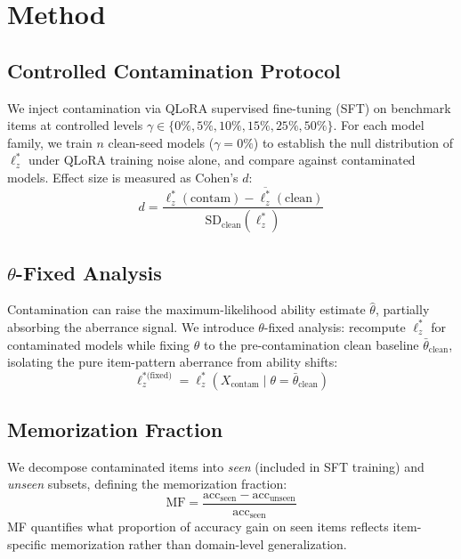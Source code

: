 \documentclass[11pt,a4paper]{article}
\begin{document}
\section{Method}
\label{sec:method}

\subsection{Controlled Contamination Protocol}

We inject contamination via QLoRA supervised fine-tuning (SFT) on benchmark items at controlled levels $\gamma \in \{0\%, 5\%, 10\%, 15\%, 25\%, 50\%\}$.
For each model family, we train $n$ clean-seed models ($\gamma=0\%$) to establish the null distribution of $\ell_z^{*}$ under QLoRA training noise alone, and compare against contaminated models.
Effect size is measured as Cohen's $d$:
\begin{equation}
d = \frac{\ell_z^{*}(\text{contam}) - \overline{\ell_z^{*}}(\text{clean})}{\text{SD}_{\text{clean}}(\ell_z^{*})}
\end{equation}

\subsection{$\theta$-Fixed Analysis}

Contamination can raise the maximum-likelihood ability estimate $\hat{\theta}$, partially absorbing the aberrance signal.
We introduce $\theta$-fixed analysis: recompute $\ell_z^{*}$ for contaminated models while fixing $\theta$ to the pre-contamination clean baseline $\bar{\theta}_{\text{clean}}$, isolating the pure item-pattern aberrance from ability shifts:
\begin{equation}
\ell_z^{*\text{(fixed)}} = \ell_z^{*}(X_{\text{contam}} \mid \theta = \bar{\theta}_{\text{clean}})
\end{equation}

\subsection{Memorization Fraction}

We decompose contaminated items into \emph{seen} (included in SFT training) and \emph{unseen} subsets, defining the memorization fraction:
\begin{equation}
\text{MF} = \frac{\text{acc}_{\text{seen}} - \text{acc}_{\text{unseen}}}{\text{acc}_{\text{seen}}}
\end{equation}
MF quantifies what proportion of accuracy gain on seen items reflects item-specific memorization rather than domain-level generalization.
\end{document}
